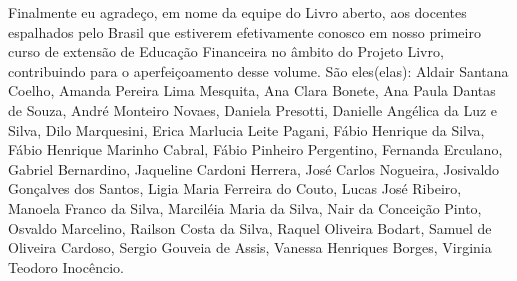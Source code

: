 Finalmente eu agradeço, em nome da equipe do Livro aberto, aos docentes espalhados pelo Brasil que estiverem efetivamente conosco em nosso primeiro curso de extensão de Educação Financeira no âmbito do Projeto Livro, contribuindo para o aperfeiçoamento desse volume. São eles(elas): Aldair Santana Coelho, Amanda Pereira Lima Mesquita, Ana Clara Bonete, Ana
Paula Dantas de Souza, André Monteiro Novaes, Daniela Presotti, Danielle Angélica da Luz e Silva, Dilo Marquesini, Erica Marlucia Leite Pagani, Fábio Henrique da Silva, Fábio Henrique Marinho Cabral, Fábio Pinheiro Pergentino, Fernanda Erculano, Gabriel Bernardino, Jaqueline Cardoni Herrera, José Carlos Nogueira, Josivaldo Gonçalves dos Santos, Ligia Maria Ferreira do Couto, Lucas José Ribeiro, Manoela Franco da Silva, Marciléia Maria da Silva, Nair da Conceição Pinto, Osvaldo Marcelino, Railson Costa da Silva, Raquel Oliveira Bodart, Samuel de Oliveira Cardoso, Sergio Gouveia de Assis, Vanessa Henriques Borges, Virginia Teodoro Inocêncio.

\mainmatter

